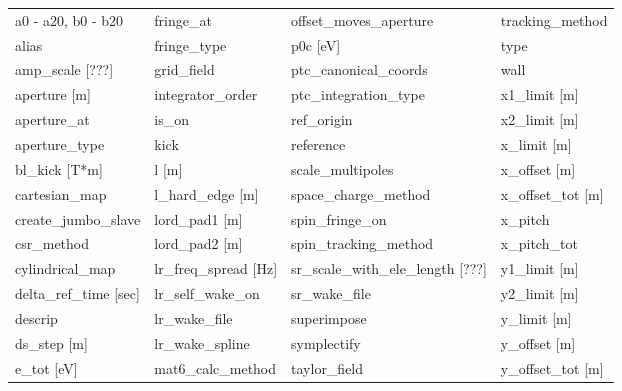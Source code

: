  \begin{tabular}{llll} \toprule
a0 - a20, b0 - b20             & fringe_at                      & offset_moves_aperture          & tracking_method                \\
alias                          & fringe_type                    & p0c [eV]                       & type                           \\
amp_scale [???]                & grid_field                     & ptc_canonical_coords           & wall                           \\
aperture [m]                   & integrator_order               & ptc_integration_type           & x1_limit [m]                   \\
aperture_at                    & is_on                          & ref_origin                     & x2_limit [m]                   \\
aperture_type                  & kick                           & reference                      & x_limit [m]                    \\
bl_kick [T*m]                  & l [m]                          & scale_multipoles               & x_offset [m]                   \\
cartesian_map                  & l_hard_edge [m]                & space_charge_method            & x_offset_tot [m]               \\
create_jumbo_slave             & lord_pad1 [m]                  & spin_fringe_on                 & x_pitch                        \\
csr_method                     & lord_pad2 [m]                  & spin_tracking_method           & x_pitch_tot                    \\
cylindrical_map                & lr_freq_spread [Hz]            & sr_scale_with_ele_length [???] & y1_limit [m]                   \\
delta_ref_time [sec]           & lr_self_wake_on                & sr_wake_file                   & y2_limit [m]                   \\
descrip                        & lr_wake_file                   & superimpose                    & y_limit [m]                    \\
ds_step [m]                    & lr_wake_spline                 & symplectify                    & y_offset [m]                   \\
e_tot [eV]                     & mat6_calc_method               & taylor_field                   & y_offset_tot [m]               \\

\end{tabular}
